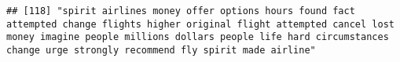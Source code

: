\documentclass[
]{article}
\begin{document}
\begin{verbatim}
## [118] "spirit airlines money offer options hours found fact attempted change flights higher original flight attempted cancel lost money imagine people millions dollars people life hard circumstances change urge strongly recommend fly spirit made airline"                                                                                                                                                                                                                                                                                                                                                                                                                                                                                                                                                                                                                                                                                                                                                                                                                                                                                                                                                                                                                                                                                                                                                                                                                                                                                                                                                                                                                                                                                                                                        

\end{verbatim}
\end{document}
